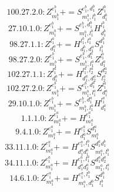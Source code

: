 \documentclass[letterpaper,10pt,fleqn,leqno,onecolumn]{article}
\begin{document}
\begin{equation} \;\;\;\;\;\;  100.27.2.0: Z^{e_{1}^{b}}_{m_{1}^{b}}+=S^{e_{1}^{b},d_{1}^{b}}_{m_{1}^{b},l_{1}^{b}}Z^{l_{1}^{b}}_{d_{1}^{b}} \end{equation}
\begin{equation} \;\;\;\;\;\;  27.10.1.0: Z^{e_{1}^{b}}_{m_{1}^{b}}+=S^{e_{1}^{b},d_{1}^{b}}_{m_{1}^{b},l_{1}^{b}}H^{l_{1}^{b}}_{d_{1}^{b}} \end{equation}
\begin{equation} \;\;\;\;\;\;  98.27.1.1: Z^{l_{1}^{a}}_{d_{1}^{a}}+=H^{l_{1}^{b},l_{1}^{a}}_{d_{1}^{b},d_{1}^{a}}S^{d_{1}^{b}}_{l_{1}^{b}} \end{equation}
\begin{equation} \;\;\;\;\;\;  98.27.2.0: Z^{e_{1}^{b}}_{m_{1}^{b}}+=S^{e_{1}^{b},d_{1}^{a}}_{m_{1}^{b},l_{1}^{a}}Z^{l_{1}^{a}}_{d_{1}^{a}} \end{equation}
\begin{equation} \;\;\;\;\;\;  102.27.1.1: Z^{l_{1}^{a}}_{d_{1}^{a}}+=H^{l_{1}^{a},l_{2}^{a}}_{d_{1}^{a},d_{2}^{a}}S^{d_{2}^{a}}_{l_{2}^{a}} \end{equation}
\begin{equation} \;\;\;\;\;\;  102.27.2.0: Z^{e_{1}^{b}}_{m_{1}^{b}}+=S^{e_{1}^{b},d_{1}^{a}}_{m_{1}^{b},l_{1}^{a}}Z^{l_{1}^{a}}_{d_{1}^{a}} \end{equation}
\begin{equation} \;\;\;\;\;\;  29.10.1.0: Z^{e_{1}^{b}}_{m_{1}^{b}}+=S^{e_{1}^{b},d_{1}^{a}}_{m_{1}^{b},l_{1}^{a}}H^{l_{1}^{a}}_{d_{1}^{a}} \end{equation}
\begin{equation} \;\;\;\;\;\;  1.1.1.0: Z^{e_{1}^{a}}_{m_{1}^{a}}+=H^{e_{1}^{a}}_{m_{1}^{a}} \end{equation}
\begin{equation} \;\;\;\;\;\;  9.4.1.0: Z^{e_{1}^{a}}_{m_{1}^{a}}+=H^{e_{1}^{a}}_{d_{1}^{a}}S^{d_{1}^{a}}_{m_{1}^{a}} \end{equation}
\begin{equation} \;\;\;\;\;\;  33.11.1.0: Z^{e_{1}^{a}}_{m_{1}^{a}}+=H^{e_{1}^{a},l_{1}^{b}}_{d_{1}^{a}d_{1}^{b}}S^{d_{1}^{a}d_{1}^{b}}_{m_{1}^{a},l_{1}^{b}} \end{equation}
\begin{equation} \;\;\;\;\;\;  34.11.1.0: Z^{e_{1}^{a}}_{m_{1}^{a}}+=H^{e_{1}^{a},l_{1}^{a}}_{d_{1}^{a}d_{2}^{a}}S^{d_{1}^{a}d_{2}^{a}}_{m_{1}^{a},l_{1}^{a}} \end{equation}
\begin{equation} \;\;\;\;\;\;  14.6.1.0: Z^{e_{1}^{a}}_{m_{1}^{a}}+=H^{e_{1}^{a},l_{1}^{b}}_{m_{1}^{a},d_{1}^{b}}S^{d_{1}^{b}}_{l_{1}^{b}} \end{equation}
\end{document}
